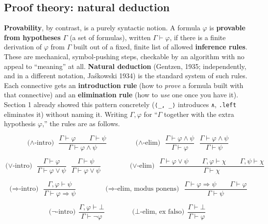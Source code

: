 \subsection{Proof theory: natural deduction}\label{sec:03-propositions-and-proofs:02-logic-recap:4}

\textbf{Provability}, by contrast, is a purely syntactic notion. A formula \(\varphi\) is \textbf{provable from hypotheses \(\Gamma\)} (a set of formulas), written \(\Gamma \vdash \varphi\), if there is a finite derivation of \(\varphi\) from \(\Gamma\) built out of a fixed, finite list of allowed \textbf{inference rules}. These are mechanical, symbol-pushing steps, checkable by an algorithm with no appeal to ``meaning'' at all. \textbf{Natural deduction} (Gentzen, 1935; independently, and in a different notation, Jaśkowski 1934) is the standard system of such rules. Each connective gets an \textbf{introduction rule} (how to \emph{prove} a formula built with that connective) and an \textbf{elimination rule} (how to \emph{use} one once you have it). Section 1 already showed this pattern concretely (\texttt{⟨\_\allowbreak{}, \_\allowbreak{}⟩} introduces \texttt{∧}, \texttt{.left} eliminates it) without naming it. Writing \(\Gamma, \varphi\) for ``\(\Gamma\) together with the extra hypothesis \(\varphi\),'' the rules are as follows.

\[
\text{($\wedge$-intro)}\ \ \frac{\Gamma \vdash \varphi \qquad \Gamma \vdash \psi}
{\Gamma \vdash \varphi \wedge \psi}
\qquad\qquad
\text{($\wedge$-elim)}\ \ \frac{\Gamma \vdash \varphi \wedge \psi}{\Gamma \vdash \varphi}
\ \ \ \frac{\Gamma \vdash \varphi \wedge \psi}{\Gamma \vdash \psi}
\]

\[
\text{($\vee$-intro)}\ \ \frac{\Gamma \vdash \varphi}{\Gamma \vdash \varphi \vee \psi}
\ \ \ \frac{\Gamma \vdash \psi}{\Gamma \vdash \varphi \vee \psi}
\qquad\qquad
\text{($\vee$-elim)}\ \ \frac{\Gamma \vdash \varphi \vee \psi \qquad \Gamma, \varphi \vdash \chi \qquad \Gamma, \psi \vdash \chi}{\Gamma \vdash \chi}
\]

\[
\text{($\Rightarrow$-intro)}\ \ \frac{\Gamma, \varphi \vdash \psi}{\Gamma \vdash \varphi \Rightarrow \psi}
\qquad\qquad
\text{($\Rightarrow$-elim, modus ponens)}\ \ \frac{\Gamma \vdash \varphi \Rightarrow \psi \qquad \Gamma \vdash \varphi}{\Gamma \vdash \psi}
\]

\[
\text{($\neg$-intro)}\ \ \frac{\Gamma, \varphi \vdash \bot}{\Gamma \vdash \neg\varphi}
\qquad\qquad
\text{($\bot$-elim, ex falso)}\ \ \frac{\Gamma \vdash \bot}{\Gamma \vdash \varphi}
\]


